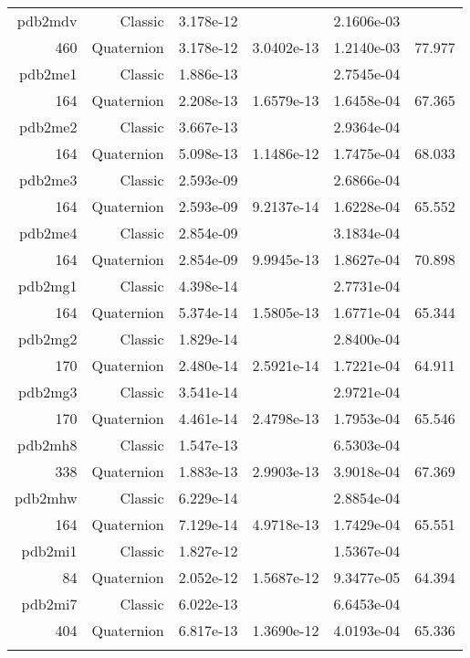 \begin{xltabular}{\textwidth}{r|rS[table-format=1.3e+2]S[table-format=1.4e+2]S[table-format=1.4e+2]S[table-format=-1.3]}
pdb2mdv & Classic & 3.178e-12 &  & 2.1606e-03 & \\
460 & Quaternion & 3.178e-12 & 3.0402e-13 & 1.2140e-03 & 77.977\\  \addlinespace
pdb2me1 & Classic & 1.886e-13 &  & 2.7545e-04 & \\
164 & Quaternion & 2.208e-13 & 1.6579e-13 & 1.6458e-04 & 67.365\\  \addlinespace
pdb2me2 & Classic & 3.667e-13 &  & 2.9364e-04 & \\
164 & Quaternion & 5.098e-13 & 1.1486e-12 & 1.7475e-04 & 68.033\\  \addlinespace
pdb2me3 & Classic & 2.593e-09 &  & 2.6866e-04 & \\
164 & Quaternion & 2.593e-09 & 9.2137e-14 & 1.6228e-04 & 65.552\\  \addlinespace
pdb2me4 & Classic & 2.854e-09 &  & 3.1834e-04 & \\
164 & Quaternion & 2.854e-09 & 9.9945e-13 & 1.8627e-04 & 70.898\\  \addlinespace
pdb2mg1 & Classic & 4.398e-14 &  & 2.7731e-04 & \\
164 & Quaternion & 5.374e-14 & 1.5805e-13 & 1.6771e-04 & 65.344\\  \addlinespace
pdb2mg2 & Classic & 1.829e-14 &  & 2.8400e-04 & \\
170 & Quaternion & 2.480e-14 & 2.5921e-14 & 1.7221e-04 & 64.911\\  \addlinespace
pdb2mg3 & Classic & 3.541e-14 &  & 2.9721e-04 & \\
170 & Quaternion & 4.461e-14 & 2.4798e-13 & 1.7953e-04 & 65.546\\  \addlinespace
pdb2mh8 & Classic & 1.547e-13 &  & 6.5303e-04 & \\
338 & Quaternion & 1.883e-13 & 2.9903e-13 & 3.9018e-04 & 67.369\\  \addlinespace
pdb2mhw & Classic & 6.229e-14 &  & 2.8854e-04 & \\
164 & Quaternion & 7.129e-14 & 4.9718e-13 & 1.7429e-04 & 65.551\\  \addlinespace
pdb2mi1 & Classic & 1.827e-12 &  & 1.5367e-04 & \\
84 & Quaternion & 2.052e-12 & 1.5687e-12 & 9.3477e-05 & 64.394\\  \addlinespace
pdb2mi7 & Classic & 6.022e-13 &  & 6.6453e-04 & \\
404 & Quaternion & 6.817e-13 & 1.3690e-12 & 4.0193e-04 & 65.336\\  \addlinespace

\end{xltabular}

